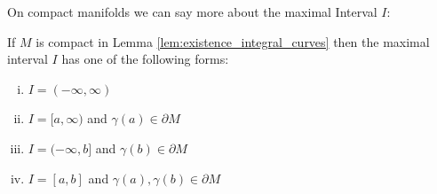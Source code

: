On compact manifolds we can say more about the maximal Interval $I$:
\begin{lemma}
\label{lem:existence_integral_curves_compact_mnf}
    If $M$ is compact in Lemma \ref{lem:existence_integral_curves} then the maximal interval $I$ has one of the following forms:
    \begin{enumerate}[(i)]
        \item $I = (-\infty,\infty)$
        \item $I = [a,\infty)$ and $\gamma(a) \in \partial M$
        \item $I = (-\infty,b]$ and $\gamma(b) \in \partial M$
        \item $I = [a,b]$ and $\gamma(a),\gamma(b) \in \partial M$
    \end{enumerate}
\end{lemma}
